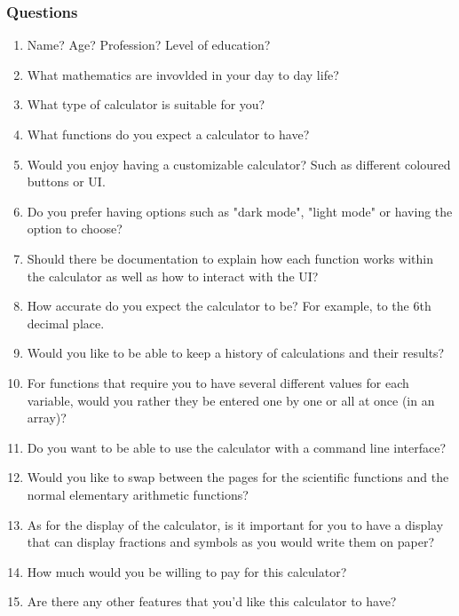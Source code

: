 \documentclass[titlepage]{article}
\begin{document}
            \subsubsection{Questions}
                \begin{enumerate}
                    \item Name? Age? Profession? Level of education?
                    \item What mathematics are invovlded in your day to day life?
                    \item What type of calculator is suitable for you?
                    \item What functions do you expect a calculator to have?
                    \item Would you enjoy having a customizable calculator? Such as different coloured buttons or UI.
                    \item Do you prefer having options such as "dark mode", "light mode" or having the option to choose?
                    \item Should there be documentation to explain how each function works within the calculator as well as how to interact with the UI?
                    \item How accurate do you expect the calculator to be? For example, to the 6th decimal place.
                    \item Would you like to be able to keep a history of calculations and their results?
                    \item For functions that require you to have several different values for each variable, would you rather they be entered one by one or all at once (in an array)?
                    \item Do you want to be able to use the calculator with a command line interface?
                    \item Would you like to swap between the pages for the scientific functions and the normal elementary arithmetic functions?
                    \item As for the display of the calculator, is it important for you to have a display that can display fractions and symbols as you would write them on paper?
                    \item How much would you be willing to pay for this calculator?
                    \item Are there any other features that you'd like this calculator to have?
                \end{enumerate}
\end{document}
